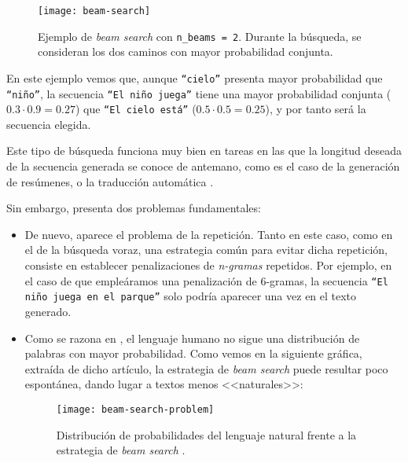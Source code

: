 \begin{figure}[!h]
	\centering
	\texttt{[image: beam-search]}
	\caption[Ejemplo de generación con búsqueda \emph{beam-search}.]{Ejemplo de \emph{beam search} con \texttt{n\_beams = 2}. Durante la búsqueda, se consideran los dos caminos con mayor probabilidad conjunta.}
	\label{fig:beam-search}
\end{figure}

En este ejemplo vemos que, aunque \texttt{``cielo''} presenta mayor probabilidad que \texttt{``niño''}, la secuencia \texttt{``El niño juega''} tiene una mayor probabilidad conjunta ($0.3 \cdot 0.9 = 0.27$) que \texttt{``El cielo está''} ($0.5 \cdot 0.5  = 0.25$), y por tanto será la secuencia elegida.

Este tipo de búsqueda funciona muy bien en tareas en las que la longitud deseada de la secuencia generada se conoce de antemano, como es el caso de la generación de resúmenes, o la traducción automática \cite{murray18, yang18}.

Sin embargo, presenta dos problemas fundamentales:

\vspace*{-\baselineskip}
\begin{itemize}
	\item [\textbullet] De nuevo, aparece el problema de la repetición. Tanto en este caso, como en el de la búsqueda voraz, una estrategia común para evitar dicha repetición, consiste en establecer penalizaciones de \emph{n-gramas} repetidos. Por ejemplo, en el caso de que empleáramos una penalización de 6-gramas, la secuencia \texttt{``El niño juega en el parque''} solo podría aparecer una vez en el texto generado.

	\item [\textbullet] Como se razona en \cite{holtzman20}, el lenguaje humano no sigue una distribución de palabras con mayor probabilidad. Como vemos en la siguiente gráfica, extraída de dicho artículo, la estrategia de \emph{beam search} puede resultar poco espontánea, dando lugar a textos menos <<naturales>>:
	
	\begin{figure}[!h]
		\centering
		\texttt{[image: beam-search-problem]}
		\caption[Distribución de probabilidades en la generación.]{Distribución de probabilidades del lenguaje natural frente a la estrategia de \emph{beam search} \cite{holtzman20}.}
	\end{figure}
\end{itemize}


